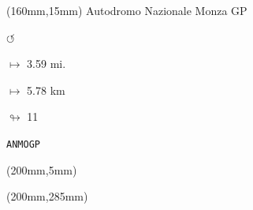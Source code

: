 \begin{textblock*}{40mm}(160mm,15mm)%
Autodromo Nazionale Monza GP
\par \Huge$\circlearrowleft$
\Large
\par$\mapsto$ 3.59 mi.
\par$\mapsto$ 5.78 km
\par$\looparrowright$ 11
\par\hfill\tiny\tt ANMOGP\\
\end{textblock*}
\begin{textblock*}{20mm}(200mm,5mm)%
\fbox{\thepage}
\end{textblock*}
\begin{textblock*}{20mm}(200mm,285mm)%
\fbox{\thepage}
\end{textblock*}
\null\newpage

